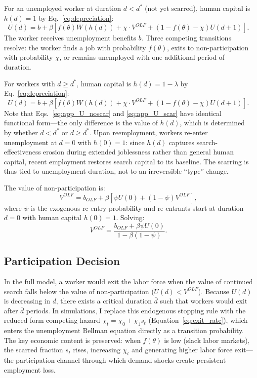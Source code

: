 \documentclass[12pt]{article}
\begin{document}
For an unemployed worker at duration $d < d^*$ (not yet scarred), human capital is $h(d) = 1$ by Eq.~\ref{eq:depreciation}:
\begin{equation}
U(d) = b + \beta \left[ f(\theta) W(h(d)) + \chi \cdot V^{OLF} + (1 - f(\theta) - \chi) U(d+1) \right].
\label{eq:app_U_noscar}
\end{equation}
The worker receives unemployment benefits $b$. Three competing transitions resolve: the worker finds a job with probability $f(\theta)$, exits to non-participation with probability $\chi$, or remains unemployed with one additional period of duration.

For workers with $d \geq d^*$, human capital is $h(d) = 1 - \lambda$ by Eq.~\ref{eq:depreciation}:
\begin{equation}
U(d) = b + \beta \left[ f(\theta) W(h(d)) + \chi \cdot V^{OLF} + (1 - f(\theta) - \chi) U(d+1) \right].
\label{eq:app_U_scar}
\end{equation}
Note that Eqs.~\ref{eq:app_U_noscar} and \ref{eq:app_U_scar} have identical functional form---the only difference is the value of $h(d)$, which is determined by whether $d < d^*$ or $d \geq d^*$. Upon reemployment, workers re-enter unemployment at $d = 0$ with $h(0) = 1$: since $h(d)$ captures search-effectiveness erosion during extended joblessness rather than general human capital, recent employment restores search capital to its baseline. The scarring is thus tied to unemployment duration, not to an irreversible ``type'' change.

The value of non-participation is:
\begin{equation}
V^{OLF} = b_{OLF} + \beta \left[ \psi U(0) + (1 - \psi) V^{OLF} \right],
\label{eq:app_VOLF}
\end{equation}
where $\psi$ is the exogenous re-entry probability and re-entrants start at duration $d = 0$ with human capital $h(0) = 1$. Solving:
\begin{equation}
V^{OLF} = \frac{b_{OLF} + \beta \psi U(0)}{1 - \beta(1 - \psi)}.
\label{eq:app_VOLF_solved}
\end{equation}

\subsection{Participation Decision}

In the full model, a worker would exit the labor force when the value of continued search falls below the value of non-participation ($U(d) < V^{OLF}$). Because $U(d)$ is decreasing in $d$, there exists a critical duration $\bar{d}$ such that workers would exit after $\bar{d}$ periods. In simulations, I replace this endogenous stopping rule with the reduced-form competing hazard $\chi_t = \chi_0 + \chi_1 s_t$ (Equation~\ref{eq:exit_rate}), which enters the unemployment Bellman equation directly as a transition probability. The key economic content is preserved: when $f(\theta)$ is low (slack labor markets), the scarred fraction $s_t$ rises, increasing $\chi_t$ and generating higher labor force exit---the participation channel through which demand shocks create persistent employment loss.
\end{document}
